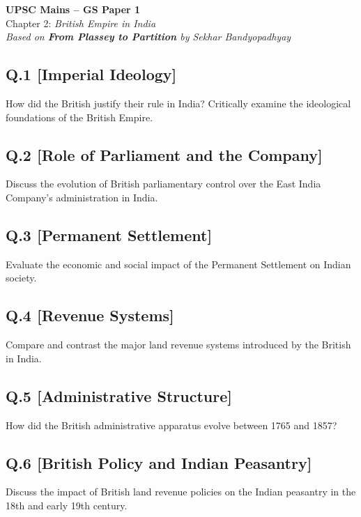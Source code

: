 
\begin{center}
    \Large\textbf{UPSC Mains – GS Paper 1}\\
    \normalsize Chapter 2: \textit{British Empire in India}\\
    \vspace{0.5em}
    \textit{Based on \textbf{From Plassey to Partition} by Sekhar Bandyopadhyay}
\end{center}

\vspace{1em}

\subsection*{Q.1 [Imperial Ideology]}
How did the British justify their rule in India? Critically examine the ideological foundations of the British Empire.

\subsection*{Q.2 [Role of Parliament and the Company]}
Discuss the evolution of British parliamentary control over the East India Company’s administration in India.

\subsection*{Q.3 [Permanent Settlement]}
Evaluate the economic and social impact of the Permanent Settlement on Indian society.

\subsection*{Q.4 [Revenue Systems]}
Compare and contrast the major land revenue systems introduced by the British in India.

\subsection*{Q.5 [Administrative Structure]}
How did the British administrative apparatus evolve between 1765 and 1857?

\subsection*{Q.6 [British Policy and Indian Peasantry]}
Discuss the impact of British land revenue policies on the Indian peasantry in the 18th and early 19th century.

